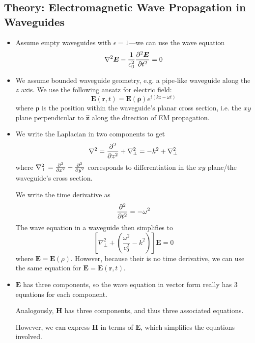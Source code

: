 \documentclass[11pt, a4paper]{article}
\renewcommand{\vec}[1]{\bm{#1}} %
\newcommand{\uvec}[1]{\hat{\vec{#1}}} %
\renewcommand{\r}{\vec{r}}
\newcommand{\rh}{\vec{\rho}}
\newcommand{\E}{\vec{E}}  %
\renewcommand{\H}{\vec{H}}  %
\newcommand{\e}{\epsilon}
\renewcommand{\laplacian}{\nabla^{2}}
\begin{document}
\subsection{Theory: Electromagnetic Wave Propagation in Waveguides}
\begin{itemize}
	\item Assume empty waveguides with $ \e = 1 $---we can use the wave equation
	\begin{equation*}
		\laplacian \E - \frac{1}{c_{0}^{2}}\pdv[2]{\E}{t} = 0
	\end{equation*}
	
	\item We assume bounded waveguide geometry, e.g. a pipe-like waveguide along the $ z $ axis. We use the following ansatz for electric field:
	\begin{equation*}
		\E(\r, t) = \E(\rh) e^{i(kz - \omega t)}
	\end{equation*}
	where $ \rh $ is the position within the waveguide's planar cross section, i.e. the $ xy $ plane perpendicular to $ \uvec{z} $ along the direction of EM propagation. 
	
	\item We write the Laplacian in two components to get
	\begin{equation*}
		\laplacian = \pdv[2]{}{z} + \nabla_{\perp}^{2} = -k^{2}  + \nabla_{\perp}^{2}
	\end{equation*}
	where $ \nabla_{\perp}^{2} = \pdv[2]{}{x} + \pdv[2]{}{y} $ corresponds to differentiation in the $ xy $ plane/the waveguide's cross section.
	
	We write the time derivative as
	\begin{equation*}
		\pdv[2]{}{t} = - \omega^{2}
	\end{equation*}
	The wave equation in a waveguide then simplifies to 
	\begin{equation*}
		 \left[\nabla_{\perp}^{2} + \left(\frac{\omega^{2}}{c_{0}^{2}} - k^{2}\right)\right]\E = 0
	\end{equation*}
	where $ \E = \E(\rho) $. However, because their is no time derivative, we can use the same equation for $ \E = \E(\r, t) $.
	
	\item $ \E $ has three components, so the wave equation in vector form really has 3 equations for each component. 
	
	Analogously, $ \H $ has three components, and thus three associated equations. 
	
	However, we can express $ \H $ in terms of $ \E $, which simplifies the equations involved. 
	
\end{itemize}
\end{document}
